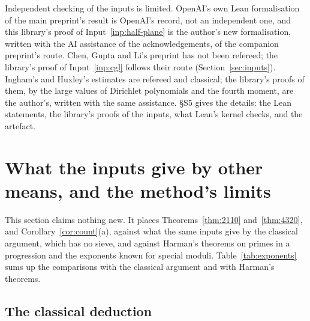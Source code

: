 \documentclass[11pt]{article}
\theoremstyle{definition}
\begin{document}
Independent checking of the inputs is limited. OpenAI's own Lean formalisation of the main preprint's result
\cite{openai-lean} is OpenAI's record, not an independent one, and this library's proof of Input~\ref{inp:half-plane}
is the author's new formalisation, written with the AI assistance of the acknowledgements, of the companion preprint's
route. Chen, Gupta and Li's preprint \cite{cgl} has not been refereed; the library's proof of Input~\ref{inp:cgl}
follows their route (Section~\ref{sec:inputs}). Ingham's and Huxley's estimates are refereed and classical; the
library's proofs of them, by the large values of Dirichlet polynomials and the fourth moment, are the author's,
written with the same assistance. \S S5 gives the details: the Lean statements, the library's proofs of the inputs,
what Lean's kernel checks, and the artefact.

\section{What the inputs give by other means, and the method's limits}\label{sec:comparison}

This section claims nothing new. It places Theorems~\ref{thm:2110} and~\ref{thm:4320}, and
Corollary~\ref{cor:count}(a), against what the same inputs give by the classical argument, which has no sieve, and
against Harman's theorems on primes in a progression and the exponents known for special moduli.
Table~\ref{tab:exponents} sums up the comparisons with the classical argument and with Harman's theorems.

\subsection*{The classical deduction}
\end{document}
